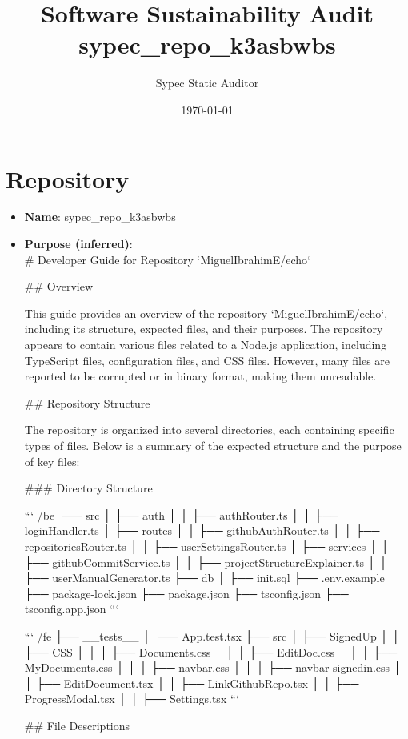 \documentclass{article}
\title{Software Sustainability Audit \\ \large sypec_repo_k3asbwbs}
\author{Sypec Static Auditor}
\date{\today}
\begin{document}
\maketitle

\section*{Repository}
\begin{itemize}[leftmargin=*]
  \item \textbf{Name}: sypec_repo_k3asbwbs
  \item \textbf{Purpose (inferred)}:\\
        # Developer Guide for Repository `MiguelIbrahimE/echo`

## Overview

This guide provides an overview of the repository `MiguelIbrahimE/echo`, including its structure, expected files, and their purposes. The repository appears to contain various files related to a Node.js application, including TypeScript files, configuration files, and CSS files. However, many files are reported to be corrupted or in binary format, making them unreadable.

## Repository Structure

The repository is organized into several directories, each containing specific types of files. Below is a summary of the expected structure and the purpose of key files:

### Directory Structure

```
/be
  ├── src
  │   ├── auth
  │   │   ├── authRouter.ts
  │   │   ├── loginHandler.ts
  │   ├── routes
  │   │   ├── githubAuthRouter.ts
  │   │   ├── repositoriesRouter.ts
  │   │   ├── userSettingsRouter.ts
  │   ├── services
  │   │   ├── githubCommitService.ts
  │   │   ├── projectStructureExplainer.ts
  │   │   ├── userManualGenerator.ts
  ├── db
  │   ├── init.sql
  ├── .env.example
  ├── package-lock.json
  ├── package.json
  ├── tsconfig.json
  ├── tsconfig.app.json
```

```
/fe
  ├── __tests__
  │   ├── App.test.tsx
  ├── src
  │   ├── SignedUp
  │   │   ├── CSS
  │   │   │   ├── Documents.css
  │   │   │   ├── EditDoc.css
  │   │   │   ├── MyDocuments.css
  │   │   │   ├── navbar.css
  │   │   │   ├── navbar-signedin.css
  │   │   ├── EditDocument.tsx
  │   │   ├── LinkGithubRepo.tsx
  │   │   ├── ProgressModal.tsx
  │   │   ├── Settings.tsx
```

## File Descriptions


\end{itemize}
\end{document}
